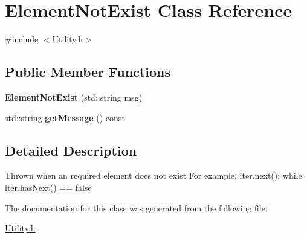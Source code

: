 \hypertarget{class_element_not_exist}{
\section{ElementNotExist Class Reference}
\label{class_element_not_exist}
}


{\ttfamily \#include $<$Utility.h$>$}

\subsection*{Public Member Functions}
\begin{DoxyCompactItemize}
\item 
\hypertarget{class_element_not_exist_a4306cc674e6e8ede2bb0b1f54fe12b77}{
{\bfseries ElementNotExist} (std::string msg)}
\label{class_element_not_exist_a4306cc674e6e8ede2bb0b1f54fe12b77}

\item 
\hypertarget{class_element_not_exist_a20e52bd3466441b814ed241e322e7cd8}{
std::string {\bfseries getMessage} () const }
\label{class_element_not_exist_a20e52bd3466441b814ed241e322e7cd8}

\end{DoxyCompactItemize}


\subsection{Detailed Description}
Thrown when an required element does not exist For example, iter.next(); while iter.hasNext() == false 

The documentation for this class was generated from the following file:\begin{DoxyCompactItemize}
\item 
\hyperlink{_utility_8h}{Utility.h}\end{DoxyCompactItemize}
